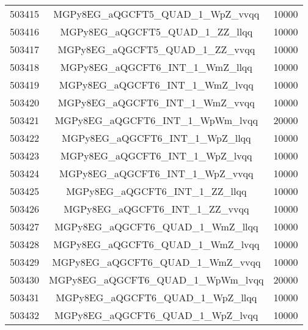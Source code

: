 \begin{table}[!htbp]
\begin{center}
\begin{tabular}{c|c|c}
503415 & MGPy8EG\_aQGCFT5\_QUAD\_1\_WpZ\_vvqq    & 10000 \\
503416 & MGPy8EG\_aQGCFT5\_QUAD\_1\_ZZ\_llqq     & 10000 \\
503417 & MGPy8EG\_aQGCFT5\_QUAD\_1\_ZZ\_vvqq     & 10000 \\
503418 & MGPy8EG\_aQGCFT6\_INT\_1\_WmZ\_llqq     & 10000 \\
503419 & MGPy8EG\_aQGCFT6\_INT\_1\_WmZ\_lvqq     & 10000 \\
503420 & MGPy8EG\_aQGCFT6\_INT\_1\_WmZ\_vvqq     & 10000 \\
503421 & MGPy8EG\_aQGCFT6\_INT\_1\_WpWm\_lvqq    & 20000 \\
503422 & MGPy8EG\_aQGCFT6\_INT\_1\_WpZ\_llqq     & 10000 \\
503423 & MGPy8EG\_aQGCFT6\_INT\_1\_WpZ\_lvqq     & 10000 \\
503424 & MGPy8EG\_aQGCFT6\_INT\_1\_WpZ\_vvqq     & 10000 \\
503425 & MGPy8EG\_aQGCFT6\_INT\_1\_ZZ\_llqq      & 10000 \\
503426 & MGPy8EG\_aQGCFT6\_INT\_1\_ZZ\_vvqq      & 10000 \\
503427 & MGPy8EG\_aQGCFT6\_QUAD\_1\_WmZ\_llqq    & 10000 \\
503428 & MGPy8EG\_aQGCFT6\_QUAD\_1\_WmZ\_lvqq    & 10000 \\
503429 & MGPy8EG\_aQGCFT6\_QUAD\_1\_WmZ\_vvqq    & 10000 \\
503430 & MGPy8EG\_aQGCFT6\_QUAD\_1\_WpWm\_lvqq   & 20000 \\
503431 & MGPy8EG\_aQGCFT6\_QUAD\_1\_WpZ\_llqq    & 10000 \\
503432 & MGPy8EG\_aQGCFT6\_QUAD\_1\_WpZ\_lvqq    & 10000 \\

\hline
\end{tabular}
\label{tabular:mc_samples_aqgc_7}
\end{center}
\end{table}


